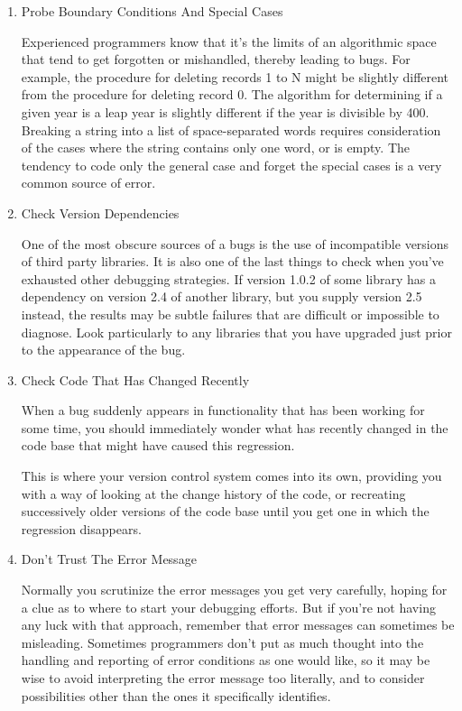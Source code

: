 \documentclass{article}
\begin{document}
\begin{enumerate}
\begin{enumerate}
\item Probe Boundary Conditions And Special Cases
\label{sec:orgheadline317}

Experienced programmers know that it's the limits of an algorithmic
space that tend to get forgotten or mishandled, thereby leading to bugs.
For example, the procedure for deleting records 1 to N might be slightly
different from the procedure for deleting record 0. The algorithm for
determining if a given year is a leap year is slightly different if the
year is divisible by 400. Breaking a string into a list of
space-separated words requires consideration of the cases where the
string contains only one word, or is empty. The tendency to code only
the general case and forget the special cases is a very common source of
error.

\item Check Version Dependencies
\label{sec:orgheadline318}

One of the most obscure sources of a bugs is the use of incompatible
versions of third party libraries. It is also one of the last things to
check when you've exhausted other debugging strategies. If version 1.0.2
of some library has a dependency on version 2.4 of another library, but
you supply version 2.5 instead, the results may be subtle failures that
are difficult or impossible to diagnose. Look particularly to any
libraries that you have upgraded just prior to the appearance of the
bug.

\item Check Code That Has Changed Recently
\label{sec:orgheadline319}

When a bug suddenly appears in functionality that has been working for
some time, you should immediately wonder what has recently changed in
the code base that might have caused this regression.

This is where your version control system comes into its own, providing
you with a way of looking at the change history of the code, or
recreating successively older versions of the code base until you get
one in which the regression disappears.

\item Don't Trust The Error Message
\label{sec:orgheadline320}

Normally you scrutinize the error messages you get very carefully,
hoping for a clue as to where to start your debugging efforts. But if
you're not having any luck with that approach, remember that error
messages can sometimes be misleading. Sometimes programmers don't put as
much thought into the handling and reporting of error conditions as one
would like, so it may be wise to avoid interpreting the error message
too literally, and to consider possibilities other than the ones it
specifically identifies.


\end{enumerate}
\end{enumerate}
\end{document}
